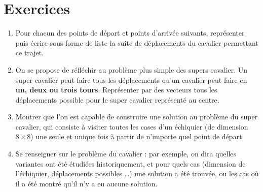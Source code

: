 \documentclass{article}
\begin{document}
\section*{Exercices}
\begin{enumerate}[label= \textbf{Exercice \arabic* : }]
\item Pour chacun des points de départ et points d'arrivée suivants, représenter puis écrire sous forme de liste la suite de déplacements du cavalier permettant ce trajet.

\vspace*{0.5cm}
\hfill
\begin{minipage}{0.3\textwidth}
\setmainfont{DejaVu Sans}
\end{minipage}
\hfill
\begin{minipage}{0.3\textwidth}
\setmainfont{DejaVu Sans}
\end{minipage}
\hfill
\begin{minipage}{0.3\textwidth}
\setmainfont{DejaVu Sans}
\end{minipage}
\hfill
\newpage
\item On se propose de réfléchir au problème plus \og simple \fg des supers cavalier. Un super cavalier peut faire tous les déplacements qu'un cavalier peut faire en \textbf{un, deux ou trois tours}. Représenter par des vecteurs tous les déplacements possible pour le super cavalier représenté au centre.
\begin{center}
\setmainfont{DejaVu Sans}
\end{center}
\item Montrer que l'on est capable de construire une solution au problème du super cavalier, qui consiste à visiter toutes les cases d'un échiquier (de dimension $8 \times 8$) une seule et unique fois à partir de n'importe quel point de départ. 
\item Se renseigner sur le problème du cavalier : par exemple, on dira quelles variantes ont été étudiées historiquement, et pour quels cas (dimension de l'échiquier, déplacements possibles \dots) une solution a été trouvée, ou les cas où il a été montré qu'il n'y a eu aucune solution. 
\end{enumerate}
\end{document}
